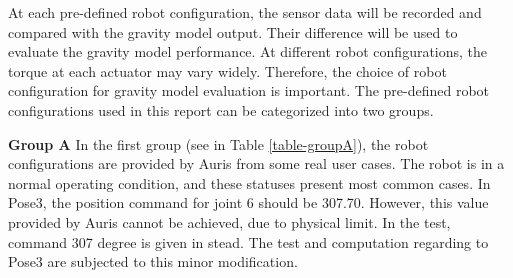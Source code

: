 At each pre-defined robot configuration, the sensor data will be recorded and compared with the gravity model output. Their difference will be used to evaluate the gravity model performance.  At different robot configurations, the torque at each actuator may vary widely. Therefore, the choice of robot configuration for gravity model evaluation is important. 
The pre-defined robot configurations used in this report can be categorized into two groups. 

\textbf{Group A}
In the first group (see in Table \ref{table-groupA}), the robot configurations are provided by Auris from some real user cases. The robot is in a normal operating condition, and these statuses present most common cases. In Pose3, the position command for joint 6 should be 307.70. However, this value provided by Auris cannot be achieved, due to physical limit. In the test, command 307 degree is given in stead. The test and computation regarding to Pose3 are subjected to this minor modification.

